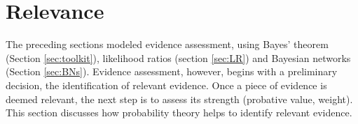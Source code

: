 \documentclass{article}
\begin{document}

























\section{Relevance}\label{sec:relevance}



The preceding sections modeled evidence assessment, using  Bayes' theorem (Section \ref{sec:toolkit}), likelihood ratios (section \ref{sec:LR}) and   Bayesian networks (Section \ref{sec:BNs}). 
Evidence assessment, however, begins with a preliminary decision, the identification of relevant evidence. 
%
Once a piece of evidence is deemed relevant, the next step is to assess its strength (probative value, weight). 
This section discusses how probability theory helps to identify relevant evidence.
\end{document}

